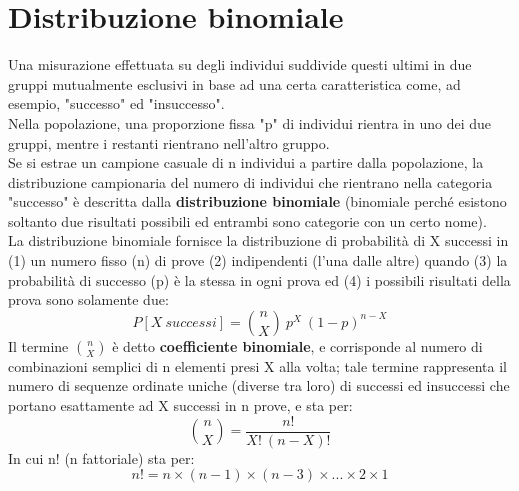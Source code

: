 \documentclass[10pt, draft]{book}
\begin{document}
\section{Distribuzione binomiale}
Una misurazione effettuata su degli individui suddivide questi ultimi in due gruppi mutualmente esclusivi in base ad una certa caratteristica come, ad esempio, "successo" ed "insuccesso".
\\
Nella popolazione, una proporzione fissa "p" di individui rientra in uno dei due gruppi, mentre i restanti rientrano nell'altro gruppo.
\\
Se si estrae un campione casuale di n individui a partire dalla popolazione, la distribuzione campionaria del numero di individui che rientrano nella categoria "successo" è descritta dalla \textbf{distribuzione binomiale} (binomiale perché esistono soltanto due risultati possibili ed entrambi sono categorie con un certo nome).
\\
La distribuzione binomiale fornisce la distribuzione di probabilità di X successi in (1) un numero fisso (n) di prove (2) indipendenti (l'una dalle altre) quando (3) la probabilità di successo (p) è la stessa in ogni prova ed (4) i possibili risultati della prova sono solamente due:
\begin{equation}
P[X \ successi] = \binom{n}{X} \ p^X \ (1 - p)^{n-X}
\end{equation}
Il termine $\binom{n}{X}$ è detto \textbf{coefficiente binomiale}, e corrisponde al numero di combinazioni semplici di n elementi presi X alla volta; tale termine rappresenta il numero di sequenze ordinate uniche (diverse tra loro) di successi ed insuccessi che portano esattamente ad X successi in n prove, e sta per:
\begin{equation}
\binom{n}{X} = \frac{n!}{X!\ (n - X)!}
\end{equation}
In cui n! (n fattoriale) sta per:
\begin{equation}
n! = n\times (n-1)\times (n-3)\times ...\times 2\times 1
\end{equation}
\end{document}

